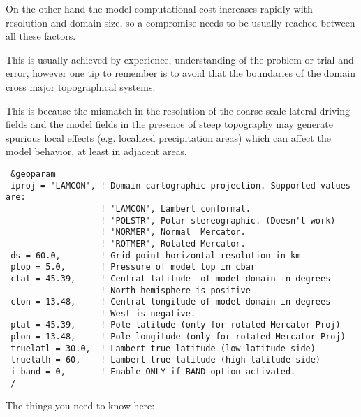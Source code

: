 On the other hand the model computational cost increases rapidly with
resolution and domain size, so a compromise needs to be usually reached
between all these factors.

This is usually achieved by experience, understanding of the problem or
trial and error, however one tip to remember is to avoid that the boundaries
of the domain cross major topographical systems.

This is because the mismatch in the resolution of the coarse scale lateral
driving fields and the model fields in the presence of steep topography may
generate spurious local effects (e.g. localized precipitation areas) which can
affect the model behavior, at least in adjacent areas. 

{\footnotesize
\begin{Verbatim}
 &geoparam
 iproj = 'LAMCON', ! Domain cartographic projection. Supported values are:
                   ! 'LAMCON', Lambert conformal.
                   ! 'POLSTR', Polar stereographic. (Doesn't work)
                   ! 'NORMER', Normal  Mercator.
                   ! 'ROTMER', Rotated Mercator.
 ds = 60.0,        ! Grid point horizontal resolution in km
 ptop = 5.0,       ! Pressure of model top in cbar
 clat = 45.39,     ! Central latitude  of model domain in degrees
                   ! North hemisphere is positive
 clon = 13.48,     ! Central longitude of model domain in degrees
                   ! West is negative.
 plat = 45.39,     ! Pole latitude (only for rotated Mercator Proj)
 plon = 13.48,     ! Pole longitude (only for rotated Mercator Proj)
 truelatl = 30.0,  ! Lambert true latitude (low latitude side)
 truelath = 60,    ! Lambert true latitude (high latitude side)
 i_band = 0,       ! Enable ONLY if BAND option activated.
 /
\end{Verbatim}
}

The things you need to know here:

